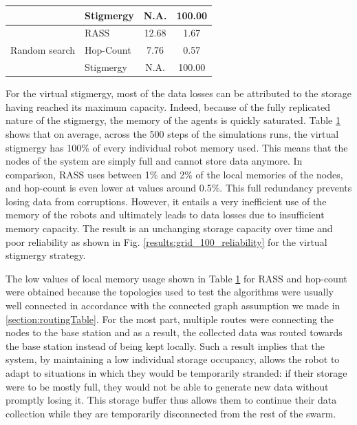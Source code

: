 \begin{table}[htbp]
\begin{tabular}{|l|l|c|c|}
                                      & Stigmergy                              & N.A.                                                                      & 100.00                                                               \\ \hline
\multirow{3}{*}{Random search}        & \ac{RASS}                                   & 12.68                                                                     & 1.67                                                                 \\
                                      & Hop-Count                              & 7.76                                                                      & 0.57                                                                 \\
                                      & Stigmergy                              & N.A.                                                                      & 100.00                                                               \\
\hline
\end{tabular}
\label{table:speed}
\end{table}

For the virtual stigmergy, most of the data losses can be attributed to the storage having reached its maximum capacity. Indeed, because of the fully replicated nature of the stigmergy, the memory of the agents is quickly saturated. Table \ref{table:speed} shows that on average, across the 500 steps of the simulations runs, the virtual stigmergy has 100\% of every individual robot memory used. This means that the nodes of the system are simply full and cannot store data anymore. In comparison, \ac{RASS} uses between 1\% and 2\% of the local memories of the nodes, and hop-count is even lower at values around 0.5\%. This full redundancy prevents losing data from corruptions. However, it entails a very inefficient use of the memory of the robots and ultimately leads to data losses due to insufficient memory capacity. The result is an unchanging storage capacity over time and poor reliability as shown in Fig. \ref{results:grid_100_reliability} for the virtual stigmergy strategy.

The low values of local memory usage shown in Table \ref{table:speed} for \ac{RASS} and hop-count were obtained because the topologies used to test the algorithms were usually well connected in accordance with the connected graph assumption we made in \ref{section:routingTable}. For the most part, multiple routes were connecting the nodes to the base station and as a result, the collected data was routed towards the base station instead of being kept locally. Such a result implies that the system, by maintaining a low individual storage occupancy, allows the robot to adapt to situations in which they would be temporarily stranded: if their storage were to be mostly full, they would not be able to generate new data without promptly losing it. This storage buffer thus allows them to continue their data collection while they are temporarily disconnected from the rest of the swarm.

